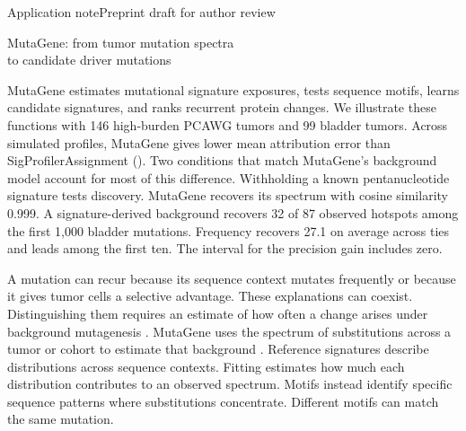\documentclass[11pt]{article}
\newcommand{\heading}[1]{\par\smallskip{\large\sffamily\color{ink}#1}\par}
\begin{document}
{\sffamily\color{ink} Application note\hfill Preprint draft for author review}\par
\vspace{6pt}
{\LARGE MutaGene: from tumor mutation spectra\\ to candidate driver mutations}\par

\heading{Abstract}
MutaGene estimates mutational signature exposures, tests sequence motifs, learns candidate signatures, and ranks recurrent protein changes.
We illustrate these functions with 146 high-burden PCAWG tumors and 99 bladder tumors.
Across \profileCount{} simulated profiles, MutaGene gives lower mean attribution error than SigProfilerAssignment (\pooledErrors).
Two conditions that match MutaGene's background model account for most of this difference.
Withholding a known pentanucleotide signature tests discovery. MutaGene recovers its spectrum with cosine similarity 0.999.
A signature-derived background recovers 32 of 87 observed hotspots among the first 1,000 bladder mutations.
Frequency recovers 27.1 on average across ties and leads among the first ten. The interval for the precision gain includes zero.

\heading{Background}
A mutation can recur because its sequence context mutates frequently or because it gives tumor cells a selective advantage.
These explanations can coexist. Distinguishing them requires an estimate of how often a change arises under background mutagenesis \cite{ranking}.
MutaGene uses the spectrum of substitutions across a tumor or cohort to estimate that background \cite{mutagene}.
Reference signatures describe distributions across sequence contexts. Fitting estimates how much each distribution contributes to an observed spectrum.
Motifs instead identify specific sequence patterns where substitutions concentrate. Different motifs can match the same mutation.
\end{document}
